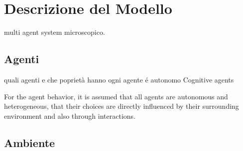 \section{Descrizione del Modello}

multi agent system microscopico.

\subsection{Agenti}
quali agenti e che poprietà hanno
ogni agente é autonomo Cognitive agents


For the agent behavior, it is
assumed that all agents are autonomous and heterogeneous, that their choices are directly
influenced by their surrounding environment and also through interactions.

\subsection{Ambiente}
